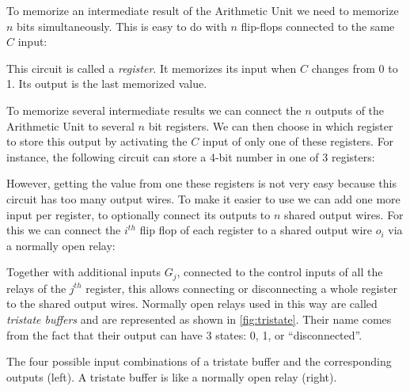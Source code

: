 To memorize an intermediate result of the Arithmetic Unit we need to memorize
$n$ bits simultaneously. This is easy to do with $n$ flip-flops connected to
the same $C$ input:

\begin{center}
  
\end{center}

This circuit is called a {\em register}. It memorizes its input when $C$
changes from 0 to 1. Its output is the last memorized value.

To memorize several intermediate results we can connect the $n$ outputs of the
Arithmetic Unit to several $n$ bit registers. We can then choose in which
register to store this output by activating the $C$ input of only one of these
registers. For instance, the following circuit can store a 4-bit number in one
of 3 registers:

\begin{center}
  
\end{center}

However, getting the value from one these registers is not very easy because
this circuit has too many output wires. To make it easier to use we can add one
more input per register, to optionally connect its outputs to $n$ shared
output wires. For this we can connect the $i^{th}$ flip flop of each register
to a shared output wire $o_i$ via a normally open relay:

\begin{center}
  
\end{center}

Together with additional inputs $G_j$, connected to the control inputs of all
the relays of the $j^{th}$ register, this allows connecting or disconnecting a
whole register to the shared output wires. Normally open relays used in this
way are called {\em tristate buffers} and are represented as shown in
\cref{fig:tristate}. Their name comes from the fact that their output can have 3
states: 0, 1, or ``disconnected''.

\begin{Figure}
  

  \caption{The four possible input combinations of a tristate buffer and the
  corresponding outputs (left). A tristate buffer is like a normally open relay
  (right).}\label{fig:tristate}
\end{Figure}

